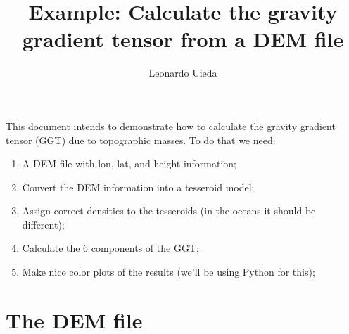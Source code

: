 \documentclass[a4paper]{article}
\title{Example: Calculate the gravity gradient tensor from a DEM file}
\author{Leonardo Uieda}
\begin{document}
\maketitle

\lstset{numbers=left,
        basicstyle=\footnotesize,
        breaklines=true}

This document intends to demonstrate how to calculate the gravity gradient
tensor (GGT) due to topographic masses. To do that we need:
\begin{enumerate}
    \item A DEM file with lon, lat, and height information;
    \item Convert the DEM information into a tesseroid model;
    \item Assign correct densities to the tesseroids (in the oceans it should be different);
    \item Calculate the 6 components of the GGT;
    \item Make nice color plots of the results (we'll be using Python for this);
\end{enumerate}



\section{The DEM file}





\end{document}
